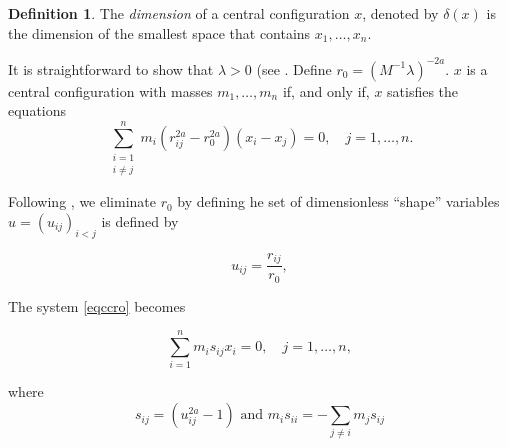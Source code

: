 \documentclass{amsart}
\theoremstyle{definition}
\newtheorem{definition}[theorem]{Definition}
\theoremstyle{remark}
\newtheorem{remark}[theorem]{Remark}
\numberwithin{equation}{section}
\begin{document}
\begin{definition}The \emph{dimension} of a central configuration $x$, denoted by $\delta(x)$ is the dimension of the smallest space that contains $x_1,...,x_n$.
\end{definition}


It is straightforward to show that $\lambda > 0$ (see \cite[p.~4]{moeckel2014lectures}. Define $r_{0}=(M^{-1}\lambda)^{-2a}$.  $x$ is a central configuration with masses $m_1, \dots, m_n$ if, and only if, $x$ satisfies the equations
\begin{equation}\label{eqccro}
\sum_{\substack{i = 1 \\ i \ne j}}^n m_i (r_{ij}^{2a}-r_{0}^{2a}) (x_i - x_j) = 0, \quad j = 1, \dots, n.
\end{equation}

Following \cite{chen2018strictly}, we eliminate $r_0$ by defining he set of dimensionless ``shape'' variables $u = (u_{ij})_{i < j}$ is defined by

\begin{equation}\label{defshape}
u_{ij} = \frac{ r_{ij}}{r_0} ,
\end{equation}

The system \eqref{eqccro} becomes

\begin{equation}\label{eqccshape}
\sum_{i = 1}^n m_i s_{ij}x_i = 0, \quad j = 1, \dots, n,
\end{equation}

where
\begin{equation}\label{sdef}
    s_{ij}=(u_{ij}^{2a}-1) \text{ and } m_{i}s_{ii}= -\sum_{j \neq i}m_js_{ij}
\end{equation}
\end{document}
